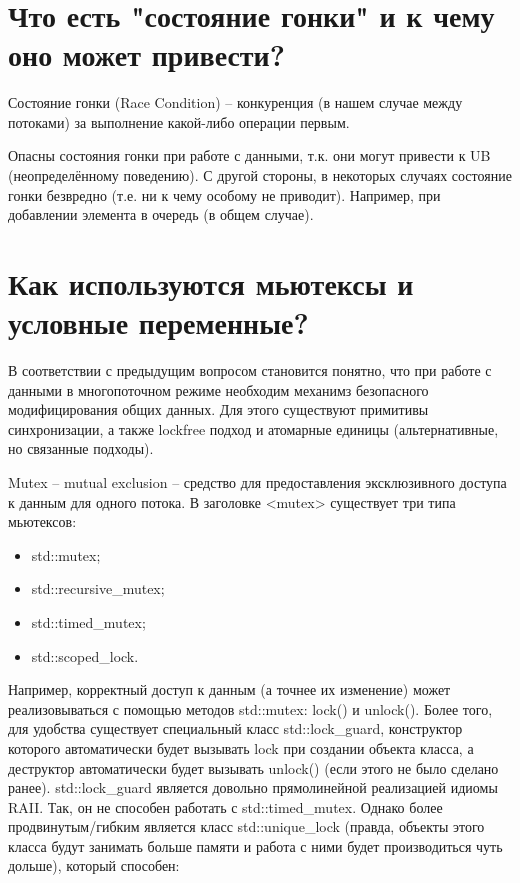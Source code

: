 \documentclass[a4paper,12pt]{article}	%
\title{
	\center{\textbf{CQ 20.}}
	}
\begin{document}

\maketitle


\section{Что есть "состояние гонки" и к чему оно может привести?}

	Состояние гонки (Race Condition) -- конкуренция (в нашем случае между потоками) за выполнение какой-либо операции первым.
	
	Опасны состояния гонки при работе с данными, т.к. они могут привести к UB (неопределённому поведению). С другой стороны, в некоторых случаях состояние гонки безвредно (т.е. ни к чему особому не приводит). Например, при добавлении элемента в очередь (в общем случае).
	
\section{Как используются мьютексы и условные переменные?}

	В соответствии с предыдущим вопросом становится понятно, что при работе с данными в многопоточном режиме необходим механимз безопасного модифицирования общих данных. Для этого существуют примитивы синхронизации, а также lockfree подход и атомарные единицы (альтернативные, но связанные подходы).
	
	Mutex -- mutual exclusion -- средство для предоставления эксклюзивного доступа к данным для одного потока. В заголовке <mutex> существует три типа мьютексов: 
	
	\begin{itemize}
	
		\item std::mutex;
		\item std::recursive\_mutex;
		\item std::timed\_mutex;
		\item std::scoped\_lock.

	\end{itemize}
	
	Например, корректный доступ к данным (а точнее их изменение) может реализовываться с помощью методов std::mutex: lock() и unlock(). Более того, для удобства существует специальный класс std::lock\_guard, конструктор которого автоматически будет вызывать lock при создании объекта класса, а деструктор автоматически будет вызывать unlock() (если этого не было сделано ранее). std::lock\_guard является довольно прямолинейной реализацией идиомы RAII. Так, он не способен работать с std::timed\_mutex. Однако более продвинутым/гибким является класс std::unique\_lock (правда, объекты этого класса будут занимать больше памяти и работа с ними будет производиться чуть дольше), который способен:
\end{document}
